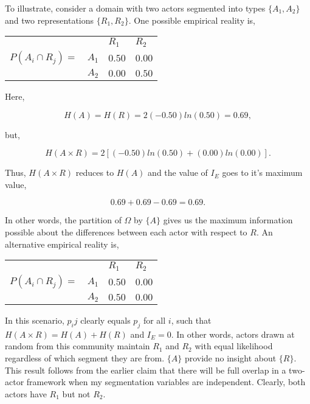 To illustrate, consider a domain with two actors segmented into types $\{A_1, A_2\}$ and two representations $\{R_1, R_2\}$.  One possible empirical reality is,

\begin{center}
\begin{tabular}{ l l l l}
& & $R_1$ & $R_2$ \\
$P(A_i \cap R_j)=$ & $A_1$ & $0.50$ & $0.00$ \\
 & $A_2$ & $0.00$ & $0.50$
\end{tabular}
\end{center}

\noindent Here, 

\begin{equation}
\nonumber H(A) = H(R) = 2(-0.50)ln(0.50) = 0.69,
\end{equation}

\noindent but,

\begin{equation}
\nonumber H(A \times R) = 2[(-0.50)ln(0.50) + (0.00)ln(0.00)].
\end{equation}

Thus, $H(A \times R)$ reduces to $H(A)$ and the value of $I_E$ goes to it's maximum value,

\begin{equation}
\nonumber 0.69 + 0.69 - 0.69 = 0.69.
\end{equation}

In other words, the partition of $\Omega$ by $\{A\}$ gives us the maximum information possible about the differences between each actor with respect to $R$. An alternative empirical reality is, 

\begin{center}
\begin{tabular}{ l l l l}
& & $R_1$ & $R_2$ \\
$P(A_i \cap R_j)=$ & $A_1$ & $0.50$ & $0.00$ \\
 & $A_2$ & $0.50$ & $0.00$
\end{tabular}
\end{center}

In this scenario, $p_ij$ clearly equals $p_j$ for all $i$, such that $H(A \times R) = H(A) + H(R)$ and $I_E = 0$. In other words, actors drawn at random from this community maintain $R_1$ and $R_2$ with equal likelihood regardless of which segment they are from. $\{A\}$ provide no insight about $\{R\}$. This result follows from the earlier claim that there will be full overlap in a two-actor framework when my segmentation variables are independent. Clearly, both actors have $R_1$ but not $R_2$.
 
